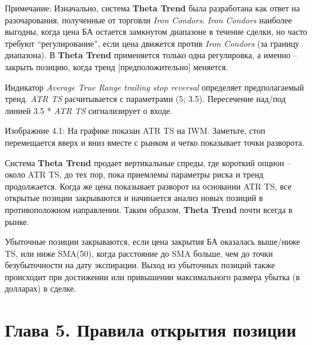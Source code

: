 \documentclass[12pt,DIV=18]{scrartcl}
\begin{document}
\bigskip

Примечание: Изначально, система \textbf{Theta Trend} была разработана как ответ на разочарования, полученные от торговли \textit{Iron Condors}. \textit{Iron Condors} наиболее выгодны, когда цена БА остается замкнутом диапазоне в течение сделки, но часто требуют ``регулирование'', если цена движется против \textit{Iron Condors} (за границу диапазона). В \textbf{Theta Trend} применяется только одна регулировка, а именно -- закрыть позицию, когда тренд [предположительно] меняется.

\bigskip

Индикатор \textit{Average  True  Range  trailing  stop  reversal} определяет предполагаемый тренд. \textit{ATR TS} расчитывается с параметрами (5; 3.5). Пересечение над/под  линией 3.5 * \textit{ATR TS} сигнализирует о входе.

Изображние 4.1: На графике показан ATR TS на IWM. Заметьте, стоп перемещается вверх и вниз вместе с рынком и четко показывает точки разворота.

\bigskip

Система \textbf{Theta Trend} продает вертикальные спреды, где короткий опцион -- около ATR TS, до тех пор, пока приемлемы параметры риска и тренд продолжается. Когда же цена показывает разворот на основании ATR TS, все открытые позиции закрываются и начинается анализ новых позиций в противоположном направлении. Таким образом, \textbf{Theta Trend} почти всегда в рынке.

\bigskip

Убыточные позиции закрываются, если цена закрытия БА оказалась выше/ниже TS, или ниже SMA(50), когда расстояние до SMA больше, чем до точки безубыточности на дату экспирации. Выход из убыточных позиций также происходит при достижении или привышении максимального размера убытка (в долларах) в сделке.

\section*{Глава 5. Правила открытия позиции}
\label{chapter5}
\end{document}
